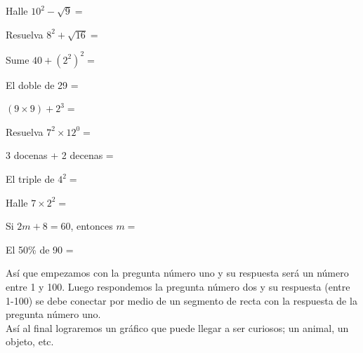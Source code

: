 \documentclass[10pt]{article}
\begin{document}
\begin{enumerate}
\begin{multicols}{2}
\item Halle $10^2-\sqrt{9}=$
\item Resuelva $8^2+\sqrt{16}=$
\item Sume $40+(2^2)^2=$
\item El doble de 29 =
\item $(9\times9)+2^3=$
\item Resuelva $7^2\times12^0=$
\item 3 docenas + 2 decenas =
\item El triple de $4^2=$
\item Halle $7\times2^2=$
\item Si $2m+8=60$, entonces $m=$
\item El 50\% de 90 = \end{multicols}
\end{enumerate}
As\'i que empezamos con la pregunta n\'umero uno y su respuesta ser\'a un n\'umero entre 1 y 100. Luego respondemos la pregunta n\'umero dos y su respuesta (entre 1-100) se debe conectar por medio de un segmento de recta con la respuesta de la pregunta n\'umero uno.\\

As\'i al final lograremos un gr\'afico que puede llegar a ser curiosos; un animal, un objeto, etc.
\end{document}
